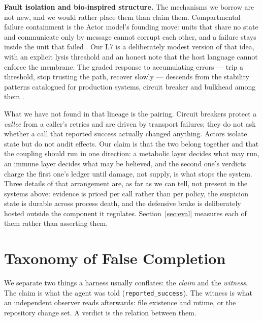 \documentclass[conference]{IEEEtran}
\begin{document}
\textbf{Fault isolation and bio-inspired structure.}
The mechanisms we borrow are not new, and we would rather place them than claim
them. Compartmental failure containment is the Actor model's founding move: units
that share no state and communicate only by message cannot corrupt each other, and
a failure stays inside the unit that failed \cite{hewitt1973actor}. Our L7 is a
deliberately modest version of that idea, with an explicit lysis threshold and an
honest note that the host language cannot enforce the membrane. The graded
response to accumulating errors --- trip a threshold, stop trusting the path,
recover slowly --- descends from the stability patterns catalogued for production
systems, circuit breaker and bulkhead among them \cite{nygard2018release}.

What we have not found in that lineage is the pairing. Circuit breakers protect a
\emph{callee} from a caller's retries and are driven by transport failures; they
do not ask whether a call that reported success actually changed anything. Actors
isolate state but do not audit effects. Our claim is that the two belong together
and that the coupling should run in one direction: a metabolic layer decides what
may run, an immune layer decides what may be believed, and the second one's
verdicts charge the first one's ledger until damage, not supply, is what stops the
system. Three details of that arrangement are, as far as we can tell, not present
in the systems above: evidence is priced per call rather than per policy, the
suspicion state is durable across process death, and the defensive brake is
deliberately hosted outside the component it regulates. Section~\ref{sec:eval}
measures each of them rather than asserting them.

\section{Taxonomy of False Completion}
\label{sec:taxonomy}

We separate two things a harness usually conflates: the \emph{claim} and the
\emph{witness}. The claim is what the agent was told (\texttt{reported\_success}).
The witness is what an independent observer reads afterwards: file existence and
mtime, or the repository change set. A verdict is the relation between them.
\end{document}
